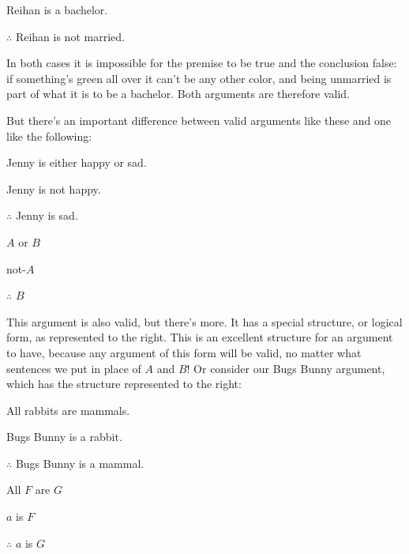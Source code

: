 	\begin{earg}
		\item[\ex{exarg6}]  Reihan is a bachelor.
		\item[] $\therefore$ Reihan is not married.
	\end{earg}	
In both cases it is impossible for the premise to be true and the conclusion false: if something's green all over it can't be any other color, and being unmarried is part of what it is to be a bachelor.  Both arguments are therefore valid. 

But there's an important difference between valid arguments like these and one like the following:

\begin{multicols}{2}
	\begin{earg}
		\item[\ex{exarg8}] Jenny is either happy or sad.
		\item[] Jenny is not happy.
		\item[] $\therefore$ Jenny is sad.
	\end{earg}

\columnbreak

	\begin{earg}
		\item[] $A$ or $B$
		\item[] not-$A$
		\item[] $\therefore$ $B$
	\end{earg}
	
\end{multicols}



\noindent This argument is also valid, but there's more.  It has a special structure, or logical form, as represented to the right.  This is an excellent structure for an argument to have, because any argument of this form will be valid, no matter what sentences we put in place of $A$ and $B$! Or consider our Bugs Bunny argument, which has the structure represented to the right:



\begin{multicols}{2}
	
\begin{earg}
\item[\eref{exarg1}]All rabbits are mammals.
\item[] Bugs Bunny is a rabbit.
\item[] $\therefore$ Bugs Bunny is a mammal.
\end{earg}
	
\columnbreak

\begin{earg}
	\item[] All $F$ are $G$
	\item[] $a$ is $F$
	\item[] $\therefore$ $a$ is $G$
\end{earg}

\end{multicols}


